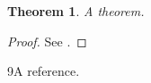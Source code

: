 \documentclass{article}
\newtheorem{theorem}{Theorem}
\begin{document}
\begin{theorem}\label{t}A theorem.\end{theorem}
\begin{proof}See \cite{knuth}.\end{proof}
\begin{thebibliography}{9}A reference.\end{thebibliography}
\end{document}
